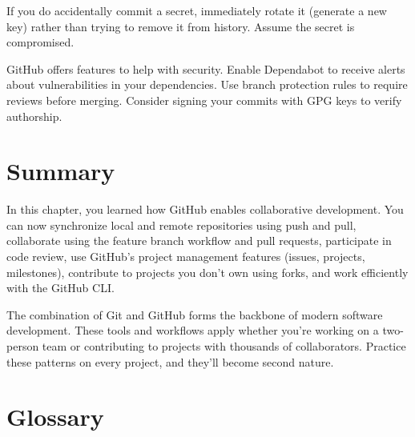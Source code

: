 \documentclass[
  letterpaper,
  DIV=11,
  numbers=noendperiod]{scrreprt}
\begin{document}
If you do accidentally commit a secret, immediately rotate it (generate
a new key) rather than trying to remove it from history. Assume the
secret is compromised.

GitHub offers features to help with security. Enable Dependabot to
receive alerts about vulnerabilities in your dependencies. Use branch
protection rules to require reviews before merging. Consider signing
your commits with GPG keys to verify authorship.

\section{Summary}\label{summary-4}

In this chapter, you learned how GitHub enables collaborative
development. You can now synchronize local and remote repositories using
push and pull, collaborate using the feature branch workflow and pull
requests, participate in code review, use GitHub's project management
features (issues, projects, milestones), contribute to projects you
don't own using forks, and work efficiently with the GitHub CLI.

The combination of Git and GitHub forms the backbone of modern software
development. These tools and workflows apply whether you're working on a
two-person team or contributing to projects with thousands of
collaborators. Practice these patterns on every project, and they'll
become second nature.

\section{Glossary}\label{glossary-4}
\end{document}
